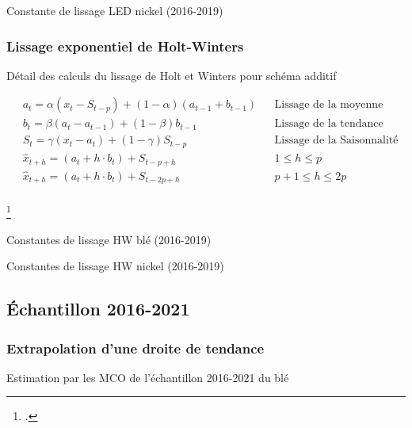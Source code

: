 \documentclass[12pt,a4paper]{article}
\begin{document}
\begin{table}[H]
    \centering
    \caption{Constante de lissage LED nickel (2016-2019)}
    \label{tab:led_nickel19}
    \sffamily
    
\end{table}

\subsubsection{Lissage exponentiel de Holt-Winters}\label{appendix:hw_19}
\begin{table}[H]
    \caption[hw]{Détail des calculs du lissage de Holt et Winters pour schéma additif \footnotemark}
    \label{tab:hw}
    \begin{align*}
        &a_{t} = \alpha(x_{t} - S_{t-p}) + (1-\alpha)(a_{t-1} + b_{t-1}) & &\text{Lissage de la moyenne}\\
        &b_{t}= \beta (a_{t}-a_{t-1}) + (1-\beta) b_{t-1} & &\text{Lissage de la tendance}\\
        &S_{t} = \gamma (x_{t}-a_{t}) + (1-\gamma) S_{t-p} & &\text{Lissage de la Saisonnalité}\\
        &\hat{x}_{t+h} = (a_{t} + h \cdot b_{t}) + S_{t-p+h} & & 1\leq h \leq p \\
        &\hat{x}_{t+h} = (a_{t} + h \cdot b_{t}) + S_{t-2p+h} & & p+1 \leq h \leq 2p\\
    \end{align*}
\end{table}
\footcitetext{terraza}
\begin{table}[H]
    \centering
    \caption{Constantes de lissage HW blé (2016-2019)}
    \label{tab:hwout_ble19}
    \sffamily
    
\end{table}
\begin{table}[H]
    \centering
    \caption{Constantes de lissage HW nickel (2016-2019)}
    \label{tab:hwout_nickel19}
    \sffamily
    
\end{table}


\subsection{Échantillon 2016-2021}
\subsubsection{Extrapolation d'une droite de tendance}\label{appendix:extra_21}
\begin{table}[H]
    \centering
    \caption{Estimation par les MCO de l'échantillon 2016-2021 du blé}
    \label{tab:mco_ble21}
    \sffamily
    
\end{table}
\end{document}
